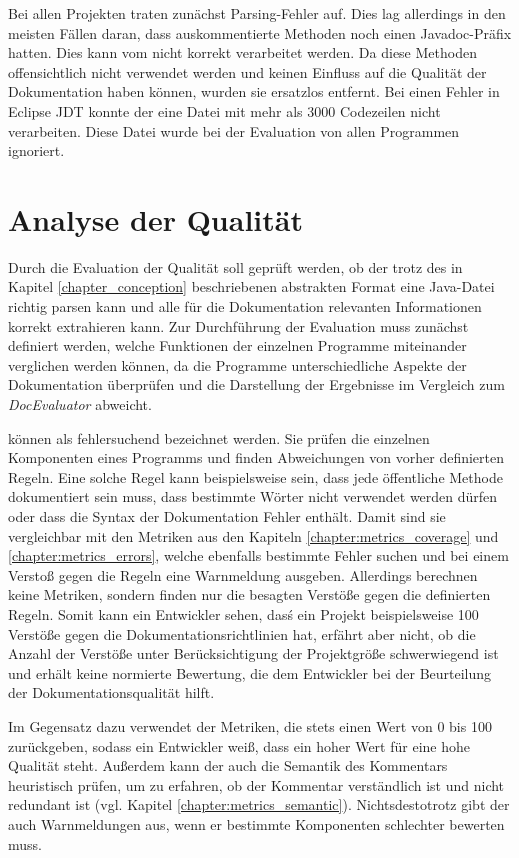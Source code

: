  Bei allen Projekten traten zunächst Parsing-Fehler auf. Dies lag allerdings in den meisten Fällen daran, dass auskommentierte Methoden noch einen Javadoc-Präfix hatten. Dies kann vom \doceval nicht korrekt verarbeitet werden. Da diese Methoden offensichtlich nicht verwendet werden und keinen Einfluss auf die Qualität der Dokumentation haben können, wurden sie ersatzlos entfernt. Bei einen Fehler in Eclipse \ac{JDT} konnte der \doceval eine Datei mit mehr als 3000 Codezeilen nicht verarbeiten. Diese Datei wurde bei der Evaluation von allen Programmen ignoriert.
\section{Analyse der Qualität}\label{chapter:quality}
Durch die Evaluation der Qualität soll geprüft werden, ob der \doceval trotz des in Kapitel \ref{chapter_conception}
 beschriebenen abstrakten Format eine Java-Datei richtig parsen kann und alle für die Dokumentation relevanten Informationen korrekt extrahieren kann. Zur Durchführung der Evaluation muss zunächst definiert werden, welche Funktionen der einzelnen Programme miteinander verglichen werden können, da die Programme unterschiedliche Aspekte der Dokumentation überprüfen und die Darstellung der Ergebnisse im Vergleich zum \textit{DocEvaluator} abweicht.

\checkpmd können als fehlersuchend bezeichnet werden. Sie prüfen die einzelnen Komponenten eines Programms und finden Abweichungen von vorher definierten Regeln. Eine solche Regel kann beispielsweise sein, dass jede öffentliche Methode dokumentiert sein muss, dass bestimmte Wörter nicht verwendet werden dürfen oder dass die Syntax der Dokumentation Fehler enthält. Damit sind sie vergleichbar mit den Metriken aus den Kapiteln \ref{chapter:metrics_coverage}  und \ref{chapter:metrics_errors}, welche ebenfalls bestimmte Fehler suchen und bei einem Verstoß gegen die Regeln eine Warnmeldung ausgeben. Allerdings berechnen \checkpmd keine Metriken, sondern finden nur die besagten Verstöße gegen die definierten Regeln. Somit kann ein Entwickler sehen, dasś ein Projekt beispielsweise 100 Verstöße gegen die Dokumentationsrichtlinien hat, erfährt aber nicht, ob die Anzahl der Verstöße unter Berücksichtigung der Projektgröße schwerwiegend ist und erhält keine normierte Bewertung, die dem Entwickler bei der Beurteilung der Dokumentationsqualität hilft. 

Im Gegensatz dazu verwendet der \doceval Metriken, die stets einen Wert von 0 bis 100 zurückgeben, sodass ein Entwickler weiß, dass ein hoher Wert für eine hohe Qualität steht. Außerdem kann der \doceval auch die Semantik des Kommentars heuristisch prüfen, um zu erfahren, ob der Kommentar verständlich ist und nicht redundant ist (vgl. Kapitel \ref{chapter:metrics_semantic}). Nichtsdestotrotz gibt der \doceval auch Warnmeldungen aus, wenn er bestimmte Komponenten schlechter bewerten muss.

